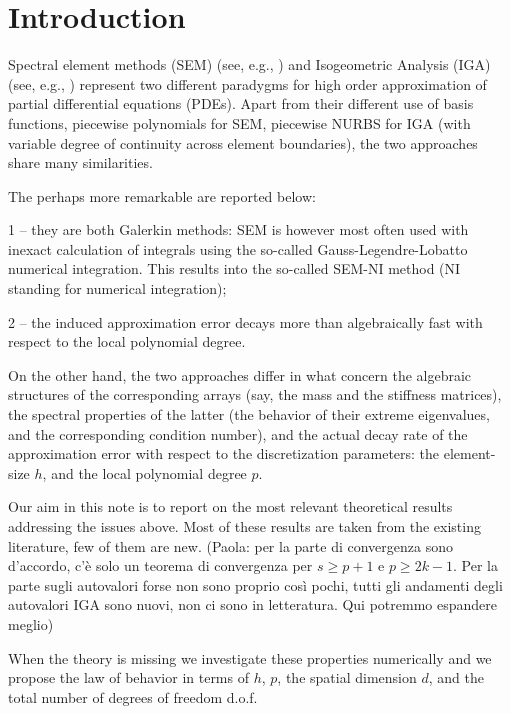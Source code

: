 \documentclass[11pt]{article}
\newcommand{\pg}{\color{red}}
\begin{document}
%


\section{Introduction}

Spectral element methods (SEM) (see, e.g., \cite{chqz07}) and 
Isogeometric Analysis (IGA) (see, e.g., \cite{chb_iga_book}) represent two 
different paradygms for high order approximation of partial differential 
equations (PDEs). Apart from their different use of basis functions, 
piecewise polynomials for SEM, piecewise NURBS for IGA (with variable 
degree of continuity across element boundaries), the two approaches share 
many similarities.

The perhaps more remarkable are reported below:

1 -- they are both Galerkin methods: SEM is however most often used with 
inexact calculation of integrals using the so-called Gauss-Legendre-Lobatto 
numerical integration. This results into the so-called SEM-NI method 
(NI standing for numerical integration);

2 -- the induced approximation error decays more than algebraically fast 
with respect to the local polynomial degree.

On the other hand, the two approaches differ in what concern the algebraic 
structures of the corresponding arrays (say, the mass and the stiffness 
matrices), the spectral properties of the latter (the behavior of their 
extreme eigenvalues, and the corresponding condition number), and the 
actual decay rate of the approximation error with respect to the 
discretization parameters: the element-size $h$, and the local polynomial 
degree $p$.

Our aim in this note is to report on the most relevant theoretical results 
addressing the issues above. Most of these results are taken from the 
existing literature, few of them are new. 
{\pg (Paola: per la parte di convergenza sono d'accordo, c'\`e solo un teorema
di convergenza per $s\geq p+1$ e $p\geq 2k-1$.
Per la parte sugli autovalori forse non sono proprio cos\`i pochi, 
tutti gli andamenti degli 
autovalori IGA sono nuovi, non ci sono in letteratura. Qui potremmo espandere
meglio)}

When the theory is missing 
we investigate these properties numerically and we propose the law of 
behavior in terms of $h$, $p$, the spatial dimension $d$, and the total 
number of degrees of freedom d.o.f.
\end{document}
